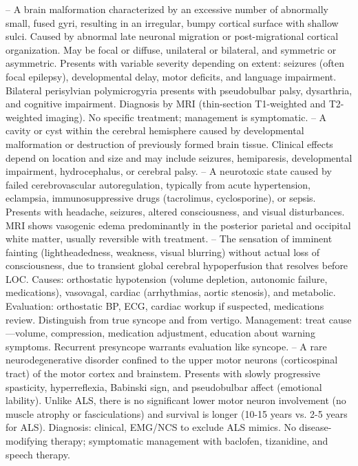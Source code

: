 -- A brain malformation characterized by an excessive number of abnormally small, fused gyri, resulting in an irregular, bumpy cortical surface with shallow sulci. Caused by abnormal late neuronal migration or post-migrational cortical organization. May be focal or diffuse, unilateral or bilateral, and symmetric or asymmetric. Presents with variable severity depending on extent: seizures (often focal epilepsy), developmental delay, motor deficits, and language impairment. Bilateral perisylvian polymicrogyria presents with pseudobulbar palsy, dysarthria, and cognitive impairment. Diagnosis by MRI (thin-section T1-weighted and T2-weighted imaging). No specific treatment; management is symptomatic.
-- A cavity or cyst within the cerebral hemisphere caused by developmental malformation or destruction of previously formed brain tissue. Clinical effects depend on location and size and may include seizures, hemiparesis, developmental impairment, hydrocephalus, or cerebral palsy.
-- A neurotoxic state caused by failed cerebrovascular autoregulation, typically from acute hypertension, eclampsia, immunosuppressive drugs (tacrolimus, cyclosporine), or sepsis. Presents with headache, seizures, altered consciousness, and visual disturbances. MRI shows vasogenic edema predominantly in the posterior parietal and occipital white matter, usually reversible with treatment.
-- The sensation of imminent fainting (lightheadedness, weakness, visual blurring) without actual loss of consciousness, due to transient global cerebral hypoperfusion that resolves before LOC. Causes: orthostatic hypotension (volume depletion, autonomic failure, medications), vasovagal, cardiac (arrhythmias, aortic stenosis), and metabolic. Evaluation: orthostatic BP, ECG, cardiac workup if suspected, medications review. Distinguish from true syncope and from vertigo. Management: treat cause—volume, compression, medication adjustment, education about warning symptoms. Recurrent presyncope warrants evaluation like syncope.
-- A rare neurodegenerative disorder confined to the upper motor neurons (corticospinal tract) of the motor cortex and brainstem. Presents with slowly progressive spasticity, hyperreflexia, Babinski sign, and pseudobulbar affect (emotional lability). Unlike ALS, there is no significant lower motor neuron involvement (no muscle atrophy or fasciculations) and survival is longer (10-15 years vs. 2-5 years for ALS). Diagnosis: clinical, EMG/NCS to exclude ALS mimics. No disease-modifying therapy; symptomatic management with baclofen, tizanidine, and speech therapy.
